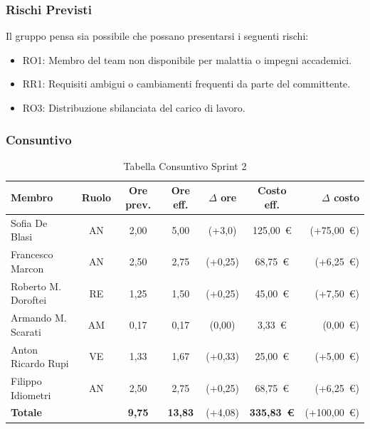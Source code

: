 \subsubsection{Rischi Previsti}
Il gruppo pensa sia possibile che possano presentarsi i seguenti rischi:
\begin{itemize}
    \item RO1: Membro del team non disponibile per malattia o impegni accademici.
    \item RR1: Requisiti ambigui o cambiamenti frequenti da parte del committente.
    \item RO3: Distribuzione sbilanciata del carico di lavoro.
\end{itemize}

\subsubsection{Consuntivo}
\begin{table}[H]
    \centering
    \renewcommand{\arraystretch}{1.3}
    \begin{tabularx}{\textwidth}{|X|c|c|c|c|c|r|}
        \hline
        \textbf{Membro} & \textbf{Ruolo} & \textbf{Ore prev.} &
        \textbf{Ore eff.} & \textbf{$\Delta$ ore} &
        \textbf{Costo eff.} & \textbf{$\Delta$ costo} \\
        \hline
        Sofia De Blasi           & AN  & 2,00  & 5,00  & {\color{red}(+3,0)} & 125{,}00~\euro & {\color{red}(+75{,}00~\euro)} \\
        Francesco Marcon         & AN  & 2,50 & 2,75 & {\color{red}(+0,25)} & 68{,}75~\euro & {\color{red}(+6{,}25~\euro)} \\
        Roberto M. Doroftei      & RE  & 1,25 & 1,50 & {\color{red}(+0,25)} & 45{,}00~\euro & {\color{red}(+7{,}50~\euro)} \\
        Armando M. Scarati     & AM  & 0,17 & 0,17 & {\color{green}(0,00)} & 3{,}33~\euro & {\color{green}(0{,}00~\euro)} \\
        Anton Ricardo Rupi       & VE  & 1,33 & 1,67  & {\color{red}(+0,33)} & 25{,}00~\euro & {\color{red}(+5{,}00~\euro)} \\
        Filippo Idiometri        & AN  & 2,50 & 2,75 & {\color{red}(+0,25)} & 68{,}75~\euro & {\color{red}(+6{,}25~\euro)} \\
        \hline
        \textbf{Totale}          &    & \textbf{9,75} &
        \textbf{13,83} & {\color{red}(+4,08)} &
        \textbf{335{,}83~\euro} & {\color{red}(+100{,}00~\euro)} \\
        \hline
    \end{tabularx}
    \caption{Tabella Consuntivo Sprint 2}   
\end{table}

